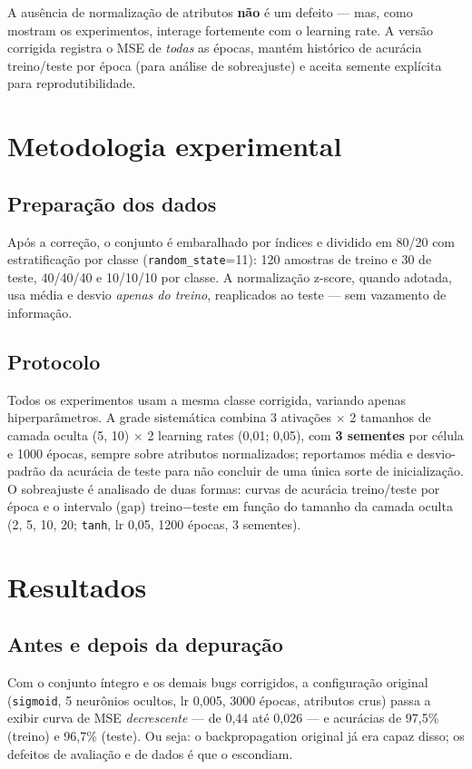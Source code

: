 \documentclass[conference]{IEEEtran}
\begin{document}
A ausência de normalização de atributos \textbf{não} é um defeito --- mas, como mostram os experimentos, interage fortemente com o learning rate. A versão corrigida registra o MSE de \emph{todas} as épocas, mantém histórico de acurácia treino/teste por época (para análise de sobreajuste) e aceita semente explícita para reprodutibilidade.

\section{Metodologia experimental}

\subsection{Preparação dos dados}

Após a correção, o conjunto é embaralhado por índices e dividido em 80/20 com estratificação por classe (\texttt{random\_state}=11): 120 amostras de treino e 30 de teste, 40/40/40 e 10/10/10 por classe. A normalização z-score, quando adotada, usa média e desvio \emph{apenas do treino}, reaplicados ao teste --- sem vazamento de informação.

\subsection{Protocolo}

Todos os experimentos usam a mesma classe corrigida, variando apenas hiperparâmetros. A grade sistemática combina 3 ativações $\times$ 2 tamanhos de camada oculta (5, 10) $\times$ 2 learning rates (0,01; 0,05), com \textbf{3 sementes} por célula e 1000 épocas, sempre sobre atributos normalizados; reportamos média e desvio-padrão da acurácia de teste para não concluir de uma única sorte de inicialização. O sobreajuste é analisado de duas formas: curvas de acurácia treino/teste por época e o intervalo (gap) treino$-$teste em função do tamanho da camada oculta (2, 5, 10, 20; \texttt{tanh}, lr 0,05, 1200 épocas, 3 sementes).

\section{Resultados}

\subsection{Antes e depois da depuração}

Com o conjunto íntegro e os demais bugs corrigidos, a configuração original (\texttt{sigmoid}, 5 neurônios ocultos, lr 0,005, 3000 épocas, atributos crus) passa a exibir curva de MSE \emph{decrescente} --- de 0,44 até 0,026 --- e acurácias de 97,5\% (treino) e 96,7\% (teste). Ou seja: o backpropagation original já era capaz disso; os defeitos de avaliação e de dados é que o escondiam.
\end{document}
